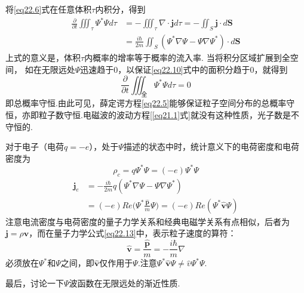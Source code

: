 将\eqref{eq22.6}式在任意体积$\tau$内积分，得到
\begin{equation} \label{eq22.10}
	\begin{aligned}
		\frac{\partial}{\partial t}\iiint_{\tau}\varPsi^{*}\varPsi d\tau
		&=-\iiint_{\tau}\nabla\cdot\boldsymbol{j}d\tau=-\iint_{S}\boldsymbol{j}\cdot d\boldsymbol{S} \\
		&=\frac{i\hbar}{2m}\iint_{S}(\varPsi^{*}\nabla\varPsi-\varPsi\nabla\varPsi^{*})\cdot d\boldsymbol{S}
	\end{aligned}
\end{equation}\eqshort
上式的意义是，体积$\tau$内概率的增率等于概率的流入率. 当将积分区域扩展到全空间， 如在无限远处$\varPsi$迅速趋于0，以保证\eqref{eq22.10}式中的面积分趋于0，就得到
\begin{equation}\label{eq22.11}
	\frac{\partial}{\partial t}\iiint_{\text{全}}\varPsi^{*}\varPsi d\tau=0
\end{equation}\eqnormal
即总概率守恒.由此可见，薛定谔方程\eqref{eq22.5}能够保证粒子空间分布的总概率守恒，亦即粒子数守恒.电磁波的波动方程[\ref{eq21.1}式]就没有这种性质，光子数是不守恒的.

对于电子（电荷$q=-e$），处于$\varPsi$描述的状态中时，统计意义下的电荷密度和电荷密度为
\begin{equation}\label{eq22.12}
	\rho_{c}=q\varPsi^{*}\varPsi=(-e)\varPsi^{*}\varPsi
\end{equation}
\begin{equation}
	\begin{aligned} \label{eq22.13}
		\boldsymbol{j}_{e}
		&=-\frac{i\hbar}{2m}q(\varPsi^{*}\nabla\varPsi-\varPsi\nabla\varPsi^{*}) \\
		&=(-e)Re\bigg(\varPsi^{*}\frac{\hat{\boldsymbol{p}}}{m}\varPsi \bigg)
		 =(-e)Re(\varPsi^{*}\hat{\boldsymbol{v}}\varPsi)
	\end{aligned}
\end{equation}\eqshort
注意电流密度与电荷密度的量子力学关系和经典电磁学关系有点相似，后者为$\boldsymbol{j}=\rho\boldsymbol{v}$，而在量子力学公式\eqref{eq22.13}中，表示粒子速度的算符：
\begin{equation}\label{eq22.14}
	\hat{\boldsymbol{v}}=\frac{\hat{\boldsymbol{p}}}{m}=-\frac{i\hbar}{m}\nabla
\end{equation}\eqnormal
必须放在$\varPsi^{*}$和$\varPsi$之间，即$\hat{\boldsymbol{v}}$仅作用于$\varPsi$.注意$\varPsi^{*}\hat{\boldsymbol{v}}\varPsi\neq\hat{v}\varPsi^{*}\varPsi$.

最后，讨论一下$\varPsi$波函数在无限远处的渐近性质.

